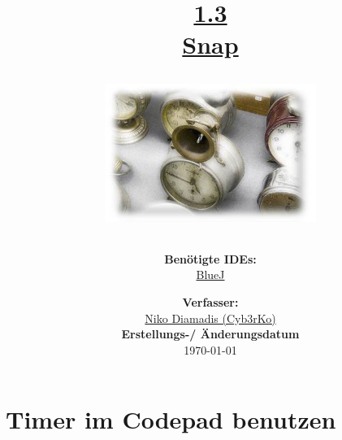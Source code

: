 \documentclass{scrartcl}   %
\begin{document}
\title{\huge{\href{https://www.inf-schule.de/oop/java/klassen/kapselung}{1.3\\Snap}}\\
\vspace{0.5cm}
\begin{figure}[ht]
	\centering
	\includegraphics[height=4.5cm]{Snap.png}
\end{figure}
\vspace{0.7cm}}

\author{\textbf{Benötigte IDEs:}\\
\href{https://www.bluej.org/}{BlueJ}
\vspace{1cm}}

\date{\textbf{Verfasser:}\\
\href{https://cyb3rko.de}{Niko Diamadis (Cyb3rKo)}\\
\vspace{1cm}
\textbf{Erstellungs-/ Änderungsdatum}\\
\today\enlargethispage{4cm}}

\doublespacing

\maketitle\thispagestyle{empty}

\cleardoublepage

\setcounter{page}{1}
\tableofcontents


\newpage
{}  %

\cleardoublepage

\section{Timer im Codepad benutzen}
\end{document}
